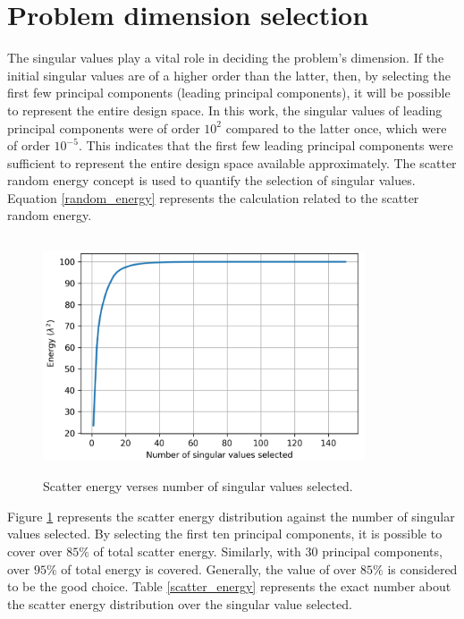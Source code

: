 \section{Problem dimension selection}
The singular values play a vital role in deciding the problem's dimension. If the initial singular values are of a higher order than the latter, then, by selecting the first few principal components (leading principal components), it will be possible to represent the entire design space. In this work, the singular values of leading principal components were of order $10^2$ compared to the latter once, which were of order $10^{-5}$. This indicates that the first few leading principal components were sufficient to represent the entire design space available approximately. The scatter random energy concept is used to quantify the selection of singular values. Equation \ref{random_energy} represents the calculation related to the scatter random energy.   
\begin{figure}[!htbp]
    \centering
    \includegraphics[width = 0.85\textwidth, height=70mm]{figures/energy_plot.png}
    \caption{Scatter energy verses number of singular values selected.}
    \label{energy plot}
\end{figure}
Figure \ref{energy plot} represents the scatter energy distribution against the number of singular values selected. By selecting the first ten principal components, it is possible to cover over $85\%$ of total scatter energy. Similarly, with 30 principal components, over $95\%$ of total energy is covered. Generally, the value of over $85\%$ is considered to be the good choice. Table \ref{scatter_energy} represents the exact number about the scatter energy distribution over the singular value selected.



